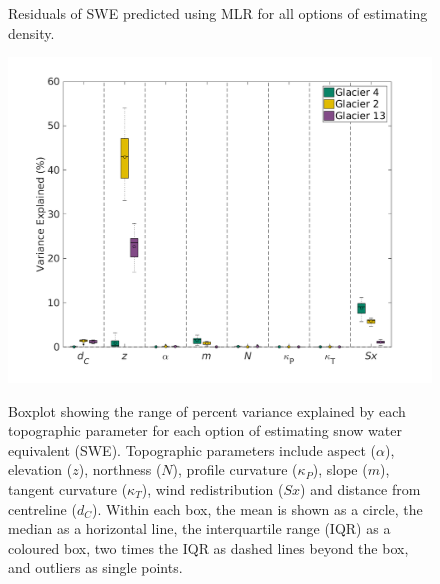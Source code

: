\documentclass[12pt]{article}
\begin{document}
\begin{figure}[H]
	\caption{Residuals of SWE predicted using MLR for all options of estimating density.}
	\label{fig:MLRresiduals_all}
\end{figure}
\begin{figure}[H]
	\centering
	\includegraphics[width =1.1 \textwidth]{Coeffs_DensityOpts.png}\\
	\caption{Boxplot showing the range of percent variance explained by each topographic parameter for each option of estimating snow water equivalent (SWE). Topographic parameters include aspect ($\alpha$), elevation ($z$), northness ($N$), profile curvature ($\kappa_P$), slope ($m$), tangent curvature ($\kappa_T$), wind redistribution ($Sx$) and distance from centreline ($d_C$). Within each box, the mean is shown as a circle, the median as a horizontal line, the interquartile range (IQR) as a coloured box, two times the IQR as dashed lines beyond the box, and outliers as single points.}
	\label{fig:MLRPercentVar_densityOptions}
\end{figure} 
\end{document}
